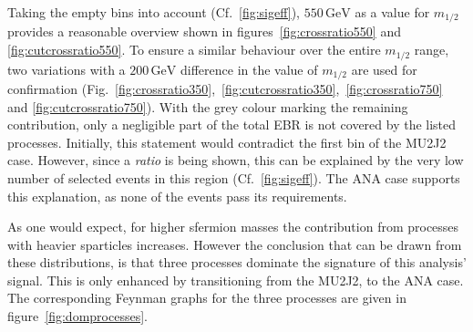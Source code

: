 Taking the empty bins into account (Cf.~\ref{fig:sigeff}), $550\,\text{GeV}$ as a value for $m_{1/2}$ provides a reasonable overview shown in figures~\ref{fig:crossratio550} and \ref{fig:cutcrossratio550}. To ensure a similar behaviour over the entire $m_{1/2}$ range, two variations with a $200\,\text{GeV}$ difference in the value of $m_{1/2}$ are used for confirmation (Fig.~\ref{fig:crossratio350},~\ref{fig:cutcrossratio350},~\ref{fig:crossratio750} and \ref{fig:cutcrossratio750}). With the grey colour marking the remaining contribution, only a negligible part of the total EBR is not covered by the listed processes. Initially, this statement would contradict the first bin of the MU2J2 case. However, since a \textit{ratio} is being shown, this can be explained by the very low number of selected events in this region (Cf.~\ref{fig:sigeff}). The ANA case supports this explanation, as none of the events pass its requirements.

As one would expect, for higher sfermion masses the contribution from processes with heavier sparticles increases. However the conclusion that can be drawn from these distributions, is that three processes dominate the signature of this analysis' signal. This is only enhanced by transitioning from the MU2J2, to the ANA case. The corresponding Feynman graphs for the three processes are given in figure~\ref{fig:domprocesses}.

